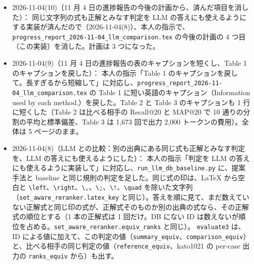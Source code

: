 \documentclass[11pt,a4paper]{jsarticle}
\begin{document}
\begin{itemize}[nosep]
    \textbf{結果}：9 回とも読める答えだったが、回ごとに答えが大きく違った。答えの集合の Jaccard 係数の平均は 0.22 で、並びまで同じ回の組はなかった。Recall@20 は、core\_032\_v1 で 3 回とも 1.000（正解式の順位は 4、5、8 位）、ms\_pfr\_kin\_001 で 3 回とも 0.500、dae\_X5\_000 で 0.600、0.800、0.000 とばらついた（回の間の標準偏差の平均 0.139、最大 0.416）。答えが 20 個に満たない回（6 個、15 個）と、同じ ID を重ねた回もあった。出力のトークン数は 34〜2{,}427 で、見積もりの 2{,}000 より少ない回が多い。
    記録：\texttt{experiments/llm\_db\_baseline/raw/claude-haiku-5-5\_\_eqd\_\_ex-none\_\_high\_\_v3.jsonl}、集計 \texttt{experiments/llm\_db\_baseline/variability\_claude-haiku-5-5\_\_eqd\_\_ex-none\_\_high\_\_v3.json}。3 件だけなので、ぶれの大きさの目安にしかならない。
  \item 2026-11-04(10)（11 月 4 日の進捗報告の今後の計画から、済んだ項目を消した）：
    同じ文字列の式も正解とみなす判定を LLM の答えにも使えるようにする実装が済んだので（2026-11-04(8)）、本人の指示で、\texttt{progress\_report\_2026-11-04\_llm\_comparison.tex} の今後の計画の 4 つ目（この実装）を消した。計画は 3 つになった。
  \item 2026-11-04(9)（11 月 4 日の進捗報告の表のキャプションを短くし、Table 1 のキャプションを戻した）：
    本人の指示「Table 1 のキャプションを戻して。長すぎるから短縮して」に対応し、\texttt{progress\_report\_2026-11-04\_llm\_comparison.tex} の Table 1 に短い英語のキャプション（Information used by each method.）を戻した。Table 2 と Table 3 のキャプションも 1 行に短くした（Table 2 は比べる相手の Recall@20 と MAP@20 で 10 通りの分割の平均と標準偏差、Table 3 は 1{,}673 回で出力 2{,}000 トークンの費用）。全体は 5 ページのまま。
  \item 2026-11-04(8)（LLM との比較：別の出典にある同じ式も正解とみなす判定を、LLM の答えにも使えるようにした）：
    本人の指示「判定を LLM の答えにも使えるように実装して」に対応し、\texttt{run\_llm\_db\_baseline.py} に、提案手法と baseline と同じ規則の判定を足した。同じ式の印は、LaTeX から空白と \texttt{\textbackslash left}、\texttt{\textbackslash right}、\texttt{\textbackslash ,}、\texttt{\textbackslash ;}、\texttt{\textbackslash !}、\texttt{\textbackslash quad} を除いた文字列（\texttt{set\_aware\_reranker.latex\_key} と同じ）。答えを順に見て、まだ数えていない正解式と同じ印の式が、正解式そのものか別の出典の式なら、その正解式の順位とする（1 本の正解式は 1 回だけ。DB にない ID は数えないが順位を占める。\texttt{set\_aware\_reranker.equiv\_ranks} と同じ）。
    \texttt{evaluate3} は、ID による値に加えて、この判定の値（\texttt{summary\_equiv}、\texttt{comparison\_equiv}）と、比べる相手の同じ判定の値（\texttt{reference\_equiv}、kato1021 の per-case 出力の \texttt{ranks\_equiv} から）も出す。

\end{itemize}
\end{document}

